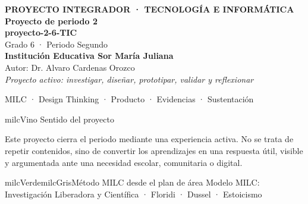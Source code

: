 \documentclass[11pt,letterpaper]{article}
\begin{document}
\thispagestyle{empty}

\vspace*{.85cm}
\begin{tcolorbox}[
  enhanced,colback=milcVino,colframe=milcVino,arc=12mm,width=.86\textwidth,
  boxrule=0pt,left=12mm,right=12mm,top=11mm,bottom=11mm,center,
  overlay={\draw[milcMagenta,line width=2pt,dash pattern=on 9pt off 8pt,rounded corners=10mm]
  ([xshift=7mm,yshift=-7mm]frame.north west) rectangle ([xshift=-7mm,yshift=7mm]frame.south east);}]
  \centering
  {\sffamily\bfseries\color{white}\fontsize{15}{17}\selectfont PROYECTO INTEGRADOR · TECNOLOGÍA E INFORMÁTICA}\\[1.0cm]
  {\sffamily\bfseries\color{white}\fontsize{30}{33}\selectfont Proyecto de periodo 2}\\[3mm]
  {\sffamily\bfseries\color{milcMostaza}\fontsize{25}{28}\selectfont proyecto-2-6-TIC}\\[8mm]
  {\sffamily\color{white}\Large Grado 6 · Periodo Segundo}\\[1.0cm]
  {\sffamily\bfseries\color{white}\large Institución Educativa Sor María Juliana}\\[2mm]
  {\sffamily\color{white}Autor: Dr. Alvaro Cardenas Orozco}\\[4mm]
  {\sffamily\itshape\color{white}Proyecto activo: investigar, diseñar, prototipar, validar y reflexionar}
\end{tcolorbox}
\vfill
\begin{tcolorbox}[enhanced,colback=milcVino!72!black,colframe=milcVino!72!black,arc=5mm,boxrule=0pt,width=.86\textwidth,left=6mm,right=6mm,top=4mm,bottom=4mm,center]
{\color{white}\sffamily\small MILC · Design Thinking · Producto · Evidencias · Sustentación}
\end{tcolorbox}

\newpage
\begin{titlebox}{milcVino}
Sentido del proyecto
\end{titlebox}
\begin{multicols}{2}
Este proyecto cierra el periodo mediante una experiencia activa. No se trata de repetir contenidos, sino de convertir los aprendizajes en una respuesta útil, visible y argumentada ante una necesidad escolar, comunitaria o digital.

\columnbreak
\begin{softbox}{milcVerde}{milcGris}{Método MILC desde el plan de área}
Modelo MILC: Investigación Liberadora y Científica · Floridi · Dussel · Estoicismo
\end{softbox}
\end{multicols}
\end{document}
